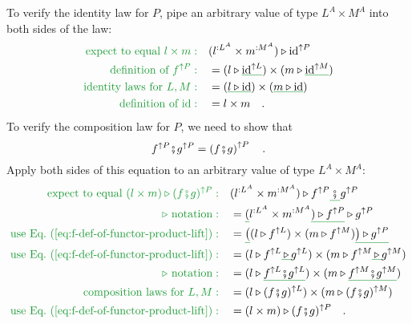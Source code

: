 To verify the identity law for $P$, pipe an arbitrary value of type
$L^{A}\times M^{A}$ into both sides of the law:
\begin{align*}
{\color{greenunder}\text{expect to equal }l\times m:}\quad & (l^{:L^{A}}\times m^{:M^{A}})\triangleright\text{id}^{\uparrow P}\\
{\color{greenunder}\text{definition of }f^{\uparrow P}:}\quad & =(l\triangleright\gunderline{\text{id}^{\uparrow L}})\times(m\triangleright\gunderline{\text{id}^{\uparrow M}})\\
{\color{greenunder}\text{identity laws for }L,M:}\quad & =(\gunderline{l\triangleright\text{id}})\times(\gunderline{m\triangleright\text{id}})\\
{\color{greenunder}\text{definition of }\text{id}:}\quad & =l\times m\quad.
\end{align*}
To verify the composition law for $P$, we need to show that
\[
f^{\uparrow P}\bef g^{\uparrow P}=\left(f\bef g\right)^{\uparrow P}\quad.
\]
Apply both sides of this equation to an arbitrary value of type $L^{A}\times M^{A}$:
\begin{align*}
{\color{greenunder}\text{expect to equal }(l\times m)\triangleright(f\bef g)^{\uparrow P}:}\quad & (l^{:L^{A}}\times m^{:M^{A}})\triangleright f^{\uparrow P}\gunderline{\,\bef\,}g^{\uparrow P}\\
{\color{greenunder}\triangleright\text{ notation}:}\quad & =\gunderline (l^{:L^{A}}\times m^{:M^{A}}\gunderline{)\triangleright f^{\uparrow P}}\triangleright g^{\uparrow P}\\
{\color{greenunder}\text{use Eq.~(\ref{eq:f-def-of-functor-product-lift})}:}\quad & =\gunderline{\big(}(l\triangleright f^{\uparrow L})\times(m\triangleright f^{\uparrow M})\gunderline{\big)\triangleright g^{\uparrow P}}\\
{\color{greenunder}\text{use Eq.~(\ref{eq:f-def-of-functor-product-lift})}:}\quad & =(l\triangleright f^{\uparrow L}\gunderline{\,\triangleright\,}g^{\uparrow L})\times(m\triangleright f^{\uparrow M}\gunderline{\,\triangleright\,}g^{\uparrow M})\\
{\color{greenunder}\triangleright\text{ notation}:}\quad & =(l\triangleright\gunderline{f^{\uparrow L}\bef g^{\uparrow L}})\times(m\triangleright\gunderline{f^{\uparrow M}\bef g^{\uparrow M}})\\
{\color{greenunder}\text{composition laws for }L,M:}\quad & =(l\triangleright(f\bef g)^{\uparrow L})\times(m\triangleright(f\bef g)^{\uparrow M})\\
{\color{greenunder}\text{use Eq.~(\ref{eq:f-def-of-functor-product-lift})}:}\quad & =(l\times m)\triangleright(f\bef g)^{\uparrow P}\quad.
\end{align*}
